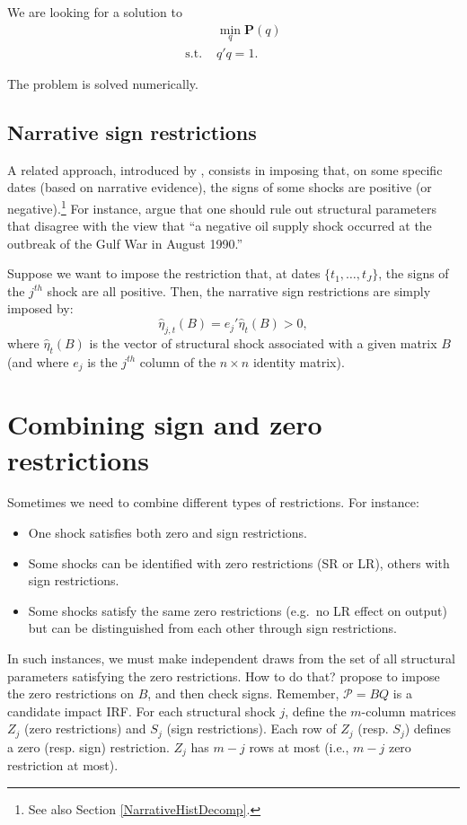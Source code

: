 \documentclass[
  12pt,
]{book}
\providecommand{\tightlist}{%
  \setlength{\itemsep}{0pt}\setlength{\parskip}{0pt}}
\theoremstyle{definition}
\theoremstyle{definition}
\theoremstyle{definition}
\theoremstyle{definition}
\theoremstyle{remark}
\begin{document}
We are looking for a solution to
\[\begin{array}{ll}
&\min_q \mathbf{P}(q)\\
\text{s.t. }&q'q=1.\end{array}\]

The problem is solved numerically.

\section{Narrative sign restrictions}\label{NarrativeSign}

A related approach, introduced by \citet{AntolinDiaz_RubioRamirez_2018}, consists in imposing that, on some specific dates (based on narrative evidence), the signs of some shocks are positive (or negative).\footnote{See also Section \ref{NarrativeHistDecomp}.} For instance, \citet{AntolinDiaz_RubioRamirez_2018} argue that one should rule out structural parameters that disagree with the view that ``a negative oil supply shock occurred at the outbreak of the Gulf War in August 1990.''

Suppose we want to impose the restriction that, at dates \(\{t_1,\dots,t_J\}\), the signs of the \(j^{th}\) shock are all positive. Then, the narrative sign restrictions are simply imposed by:
\[
\hat{\eta}_{j,t}(B) = e_j'\hat\eta_{t}(B) > 0,
\]
where \(\hat\eta_{t}(B)\) is the vector of structural shock associated with a given matrix \(B\) (and where \(e_j\) is the \(j^{th}\) column of the \(n \times n\) identity matrix).

\chapter{Combining sign and zero restrictions}\label{SignsZeros}

Sometimes we need to combine different types of restrictions. For instance:

\begin{itemize}
\tightlist
\item
  One shock satisfies both zero and sign restrictions.
\item
  Some shocks can be identified with zero restrictions (SR or LR), others with sign restrictions.
\item
  Some shocks satisfy the same zero restrictions (e.g.~no LR effect on output) but can be distinguished from each other through sign restrictions.
\end{itemize}

In such instances, we must make independent draws from the set of all structural parameters satisfying the zero restrictions. How to do that? \citet{Arias_et_al_2018} propose to impose the zero restrictions on \(B\), and then check signs. Remember, \(\mathcal{P}=BQ\) is a candidate impact IRF. For each structural shock \(j\), define the \(m\)-column matrices \(Z_j\) (zero restrictions) and \(S_j\) (sign restrictions). Each row of \(Z_j\) (resp. \(S_j\)) defines a zero (resp. sign) restriction. \(Z_j\) has \(m-j\) rows at most (i.e., \(m-j\) zero restriction at most).
\end{document}
